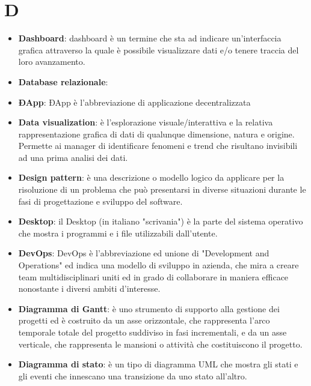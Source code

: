 \documentclass[a4paper, oneside, openany]{article}
\begin{document}
\section{D}
\begin{itemize}
\item \textbf{Dashboard}: dashboard è un termine che sta ad indicare un'interfaccia grafica attraverso la quale è possibile visualizzare dati e/o tenere traccia del loro avanzamento.
\item \textbf{Database relazionale}:
\item \textbf{ÐApp}: ÐApp è l'abbreviazione di applicazione decentralizzata
\item \textbf{Data visualization}: è l'esplorazione visuale/interattiva e la relativa rappresentazione grafica di dati di qualunque dimensione, natura e origine. Permette ai manager di identificare fenomeni e trend che risultano invisibili ad una prima analisi dei dati.
\item \textbf{Design pattern}: è una descrizione o modello logico da applicare per la risoluzione di un problema che può presentarsi in diverse situazioni durante le fasi di progettazione e sviluppo del software.
\item \textbf{Desktop}: il Desktop (in italiano "scrivania") è la parte del sistema operativo che mostra i programmi e i file utilizzabili dall'utente.
\item \textbf{DevOps}: DevOps è l'abbreviazione ed unione di "Development and Operations" ed indica una modello di sviluppo in azienda, che mira a creare team multidisciplinari uniti ed in grado di collaborare in maniera efficace nonostante i diversi ambiti d'interesse.
\item \textbf{Diagramma di Gantt}: è uno strumento di supporto alla gestione dei progetti ed è costruito da un asse orizzontale, che rappresenta l'arco temporale totale del progetto suddiviso in fasi incrementali, e da un asse verticale, che rappresenta le mansioni o attività che costituiscono il progetto.
\item \textbf{Diagramma di stato}: è un tipo di diagramma UML che mostra gli stati e gli eventi che innescano una transizione da uno stato all'altro.
\end{itemize}
\end{document}
